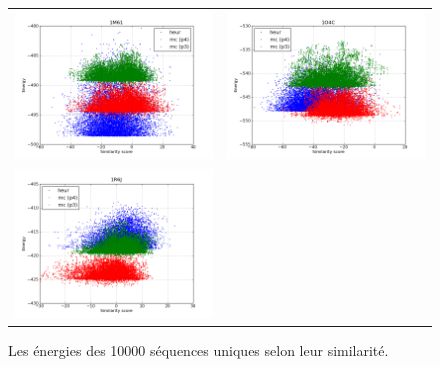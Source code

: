 \documentclass[a4paper,12pt]{article}
\begin{document}
\begin{figure}[t]
\begin{tabular}{cc}
       \includegraphics[width=8.45cm]{gen_08032012/1M61/1M61_simil_vs_ener.png} &
       \includegraphics[width=8.45cm]{gen_08032012/1O4C/1O4C_simil_vs_ener.png} \\
       \includegraphics[width=8.45cm]{gen_08032012/1R6J/1R6J_simil_vs_ener.png} \\
     \end{tabular}

     \caption{Les énergies des 10000 séquences uniques  selon leur similarité.} 
   \end{figure}
\end{document}
